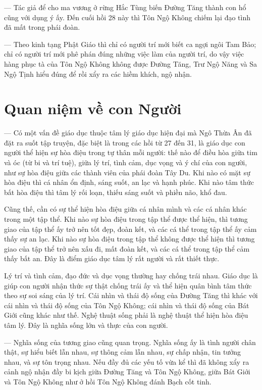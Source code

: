 — Tác giả để cho ma vương ở rừng Hắc Tùng biến Đường Tăng thành con hổ cũng với dụng ý ấy. Đến cuối hồi 28 này thì Tôn Ngộ Không chiếm lại đạo tình đã mất trong phái đoàn.

— Theo kinh tạng Phật Giáo thì chỉ có người trí mới biết ca ngợi ngôi Tam Bảo; chỉ có người trí mới phê phán đúng những việc làm của người trí, do vậy việc hàng phục tà của Tôn Ngộ Không không được Đường Tăng, Trư Ngộ Năng và Sa Ngộ Tịnh hiểu đúng để rồi xẩy ra các hiềm khích, ngộ nhận.

\section{Quan niệm về con Người} %
\label{sec:27_28_con_nguoi}

— Có một vấn đề giáo dục thuộc tâm lý giáo dục hiện đại mà Ngô Thừa Ân đã đặt ra suốt tập truyện, đặc biệt là trong các hồi từ 27 đến 31, là giáo dục con người thể hiện sự hòa điệu trong tự thân mỗi người: thế nào để điều hòa giữa tim và óc (từ bi và trí tuệ), giữa lý trí, tình cảm, dục vọng và ý chí của con người, như sự hòa điệu giữa các thành viên của phái đoàn Tây Du. Khi nào có mặt sự hòa điệu thì cá nhân ổn định, sáng suốt, an lạc và hạnh phúc. Khi nào tâm thức bất hòa điệu thì tâm lý rối loạn, thiếu sáng suốt và phiền não, khổ đau.

Cũng thế, cần có sự thể hiện hòa điệu giữa cá nhân mình và các cá nhân khác trong một tập thể. Khi nào sự hòa điệu trong tập thể được thể hiện, thì tương giao của tập thể ấy trở nên tốt đẹp, đoàn kết, và các cá thể trong tập thể ấy cảm thấy sự an lạc. Khi nào sự hòa điệu trong tập thể không được thể hiện thì tương giao của tập thể trở nên xấu đi, mất đoàn kết, và các cá thể trong tập thể cảm thấy bất an. Đây là điểm giáo dục tâm lý rất người và rất thiết thực.

Lý trí và tình cảm, đạo đức và dục vọng thường hay chống trái nhau. Giáo dục là giúp con người nhận thức sự thật chống trái ấy và thể hiện quân bình tâm thức theo sự soi sáng của lý trí. Cái nhìn và thái độ sống của Đường Tăng thì khác với cái nhìn và thái độ sống của Tôn Ngộ Không; cái nhìn và thái độ sống của Bát Giới cũng khác như thế. Nghệ thuật sống phải là nghệ thuật thể hiện hòa điệu tâm lý. Đây là nghĩa sống lớn và thực của con người.

— Nghĩa sống của tương giao cũng quan trọng. Nghĩa sống ấy là tình người chân thật, sự hiểu biết lẫn nhau, sự thông cảm lẫn nhau, sự chấp nhận, tin tưởng nhau, và sự tôn trọng nhau. Nếu đầy đủ các yếu tố vừa kể thì đã không xẩy ra cảnh ngộ nhận đầy bi kịch giữa Đường Tăng và Tôn Ngộ Không, giữa Bát Giới và Tôn Ngộ Không như ở hồi Tôn Ngộ Không đánh Bạch cốt tinh.

